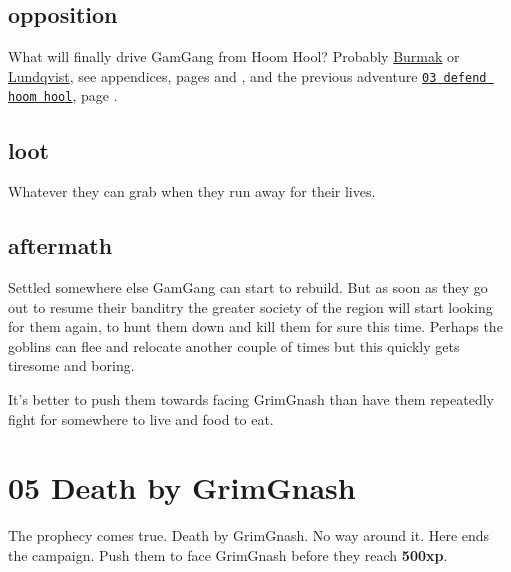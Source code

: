 \subsection*{opposition}

What will finally drive GamGang from Hoom Hool? Probably \hyperref[appendixburmak]{Burmak} or \hyperref[appendixlundqvist]{Lundqvist}, see appendices, pages \pageref{appendixburmak} and \pageref{appendixlundqvist}, and the previous adventure \hyperref[03defendhoomhool]{\texttt{03 defend hoom hool}}, page \pageref{03defendhoomhool}.


\subsection*{loot}

Whatever they can grab when they run away for their lives.


\subsection*{aftermath}

Settled somewhere else GamGang can start to rebuild. But as soon as they go out to resume their banditry the greater society of the region will start looking for them again, to hunt them down and kill them for sure this time. Perhaps the goblins can flee and relocate another couple of times but this quickly gets tiresome and boring.

It's better to push them towards facing GrimGnash than have them repeatedly fight for somewhere to live and food to eat.













\clearpage
\section*{05 Death by GrimGnash}
\label{05deathbygrimgnash}


The prophecy comes true. Death by GrimGnash. No way around it. Here ends the campaign. Push them to face GrimGnash before they reach \textbf{500xp}.


